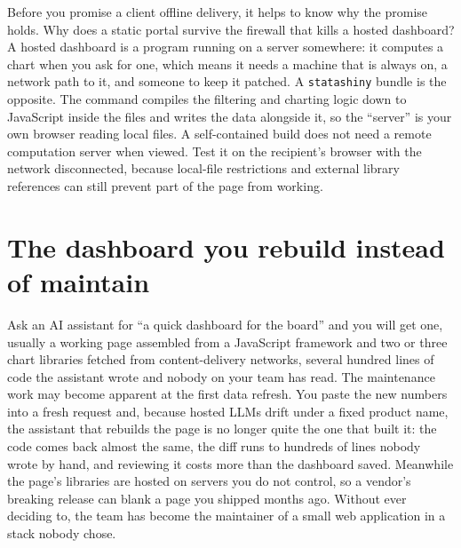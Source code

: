 \documentclass[
    a4paper,
    fontsize=10pt,
    twoside=true,
    numbers=noenddot,
]{kaobook}
\begin{document}
Before you promise a client offline delivery, it helps to know why the promise holds. Why does a static portal survive the firewall that kills a hosted dashboard? A hosted dashboard is a program running on a server somewhere: it computes a chart when you ask for one, which means it needs a machine that is always on, a network path to it, and someone to keep it patched. A \texttt{statashiny} bundle is the opposite. The command compiles the filtering and charting logic down to JavaScript inside the files and writes the data alongside it, so the \enquote{server} is your own browser reading local files. A self-contained build does not need a remote computation server when viewed. Test it on the recipient's browser with the network disconnected, because local-file restrictions and external library references can still prevent part of the page from working.

\section{The dashboard you rebuild instead of maintain}\label{sec:dashboardbuilder}
Ask an AI assistant for \enquote{a quick dashboard for the board} and you will get one, usually a working page assembled from a JavaScript framework and two or three chart libraries fetched from content-delivery networks, several hundred lines of code the assistant wrote and nobody on your team has read. The maintenance work may become apparent at the first data refresh. You paste the new numbers into a fresh request and, because hosted LLMs drift under a fixed product name, the assistant that rebuilds the page is no longer quite the one that built it: the code comes back almost the same, the diff runs to hundreds of lines nobody wrote by hand, and reviewing it costs more than the dashboard saved. Meanwhile the page's libraries are hosted on servers you do not control, so a vendor's breaking release can blank a page you shipped months ago. Without ever deciding to, the team has become the maintainer of a small web application in a stack nobody chose.
\end{document}
